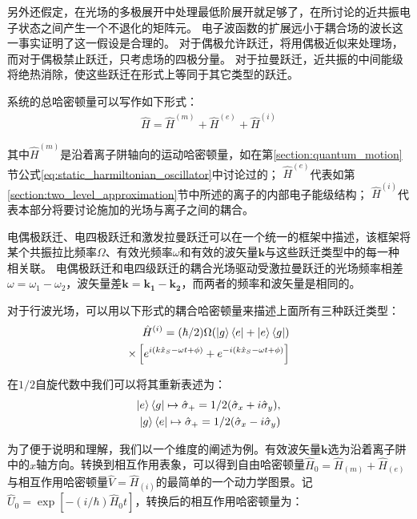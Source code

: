 另外还假定，在光场的多极展开中处理最低阶展开就足够了，在所讨论的近共振电子状态之间产生一个不退化的矩阵元。
电子波函数的扩展远小于耦合场的波长这一事实证明了这一假设是合理的。
对于偶极允许跃迁，将用偶极近似来处理场，而对于偶极禁止跃迁，只考虑场的四极分量。
对于拉曼跃迁，近共振的中间能级将绝热消除，使这些跃迁在形式上等同于其它类型的跃迁。

系统的总哈密顿量可以写作如下形式：
\begin{align}
    \hat{H}=\hat{H}^{(m)}+\hat{H}^{(e)}+\hat{H}^{(i)}
\end{align}

其中$\hat{H}^{(m)}$是沿着离子阱轴向的运动哈密顿量，如在第\ref{section:quantum_motion}节公式\eqref{eq:static_harmiltonian_oscillator}中讨论过的；
$\hat{H}^{(e)}$代表如第\ref{section:two_level_approximation}节中所述的离子的内部电子能级结构；
$\hat{H}^{(i)}$代表本部分将要讨论施加的光场与离子之间的耦合。

电偶极跃迁、电四极跃迁和激发拉曼跃迁可以在一个统一的框架中描述，该框架将某个共振拉比频率$\Omega$、有效光频率$\omega$和有效的波矢量$\mathbf{k}$与这些跃迁类型中的每一种相关联。
电偶极跃迁和电四级跃迁的耦合光场驱动受激拉曼跃迁的光场频率相差$\omega=\omega_1-\omega_2$，波矢量差$\mathbf{k}=\mathbf{k_1}-\mathbf{k_2}$，而两者的频率和波矢量是相同的。


对于行波光场，可以用以下形式的耦合哈密顿量来描述上面所有三种跃迁类型：
\begin{align}
    \hat{H}^{(i)}=(\hbar/2)\Omega(\ket{g}\bra{e}+\ket{e}\bra{g})\\
    \times\left[e^{i(k\hat{x}_S-\omega t + \phi)}+e^{-i(k\hat{x}_S-\omega t + \phi)}\right]
\end{align}

在$1/2$自旋代数中我们可以将其重新表述为：
\begin{align}
    \ket{e}\bra{g}\mapsto\hat{\sigma}_+=1/2(\hat{\sigma}_x+i\hat{\sigma}_y),\\
    \ket{g}\bra{e}\mapsto\hat{\sigma}_+=1/2(\hat{\sigma}_x-i\hat{\sigma}_y)
\end{align}

为了便于说明和理解，我们以一个维度的阐述为例。有效波矢量$\mathbf{k}$选为沿着离子阱中的$x$轴方向。转换到相互作用表象，可以得到自由哈密顿量$\hat{H}_0=\hat{H}_{(m)}+\hat{H}_{(e)}$与相互作用哈密顿量$\hat{V}=\hat{H}_{(i)}$的最简单的一个动力学图景。记$\hat{U}_0=\exp[-(i/\hbar)\hat{H}_0t]$，转换后的相互作用哈密顿量为：

